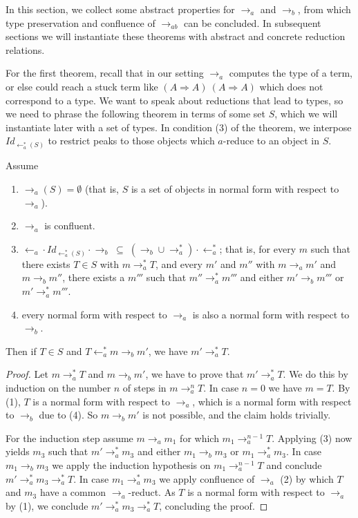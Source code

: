 \documentclass{LMCS}
\newcommand{\subse}{\; \subseteq \;}
\newcommand{\To}[0]{\Rightarrow}
\begin{document}
In this section, we collect some abstract properties for $\to_a$ and
$\to_b$, from which type preservation and confluence of $\to_{ab}$ can
be concluded. In subsequent sections we will instantiate these
theorems with abstract and concrete reduction relations.

For the first theorem, recall that in our setting $\to_a$ computes the
type of a term, or else could reach a stuck term like $(A\To A)\ (A\To
A)$ which does not correspond to a type.  We want to speak about
reductions that lead to types, so we need to phrase the following
theorem in terms of some set $S$, which we will instantiate later with
a set of types.  In condition (3) of the theorem, we interpose
$\textit{Id}_{\leftarrow_a^*(S)}$ to restrict peaks to those objects
which $a$-reduce to an object in $S$.

\begin{thm}
\label{thmtp}
Assume
\begin{enumerate}[\em(1)]
\item $\to_a(S) = \emptyset$ (that is, $S$ is a set of objects in normal form with respect to $\to_a$).
\item $\to_a$ is confluent.
\item $\leftarrow_a \cdot \textit{Id}_{\leftarrow_a^*(S)} \cdot \to_b
  \subse (\to_b \cup \to_a^*) \cdot \leftarrow_a^*$; that is, for
  every $m$ such that there exists $T\in S$ with
  $m\rightarrow_a^* T$, and every $m'$ and $m''$ with $m\rightarrow_a
  m'$ and $m\rightarrow_b m''$, there exists a $m'''$ such that
  $m''\rightarrow_a^* m'''$ and either $m'\rightarrow_b m'''$ or
  $m'\rightarrow_a^* m'''$.
\item every normal form with respect to $\to_a$
is also a normal form with respect to $\to_b$.
\end{enumerate}
Then if $T\in S$ and $T \leftarrow_a^* m \to_b m'$, we have $m' \to_a^* T$.
\end{thm}

\begin{proof}
Let $m \to_a^* T$ and $m\to_b m'$, we have to prove that $m'\to_a^*
T$.  We do this by induction on the number $n$ of steps in $m \to_a^n
T$. In case $n=0$ we have $m = T$.  By (1), $T$ is a normal form with
respect to $\to_a$, which is a normal form with respect to $\to_b$ due
to (4). So $m\to_b m'$ is not possible, and the claim holds
trivially.

For the induction step assume $m \to_a m_1$ for which $m_1 \to_a^{n-1}
T$. Applying (3) now yields $m_3$ such that $m' \to_a^* m_3$ and
either $m_1 \to_b m_3$ or $m_1 \to_a^* m_3$. In case $m_1 \to_b m_3$
we apply the induction hypothesis on $m_1 \to_a^{n-1} T$ and conclude
$m' \to_a^* m_3 \to_a^* T$.  In case $m_1 \to_a^* m_3$ we apply
confluence of $\to_a$ (2) by which $T$ and $m_3$ have a common
$\to_a$-reduct. As $T$ is a normal form with respect to $\to_a$ by
(1), we conclude $m' \to_a^* m_3 \to_a^* T$, concluding the proof.
\end{proof}
\end{document}

